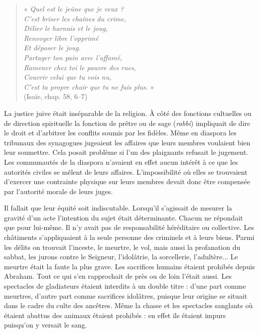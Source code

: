 \begin{verse}
 « \emph{Quel est le jeûne que je veux ? \\
 C'est briser les chaînes du crime, \\
 Délier le harnais et le joug, \\
 Renvoyer libre l'opprimé \\
 Et déposer le joug. \\
 Partager ton pain avec l'affamé, \\
 Ramener chez toi le pauvre des rues, \\
 Couvrir celui que tu vois nu, \\
 C'est ta propre chair que tu ne fuis plus.} » \\
 (Isaïe, chap. 58, 6--7)
\end{verse}



 La justice juive était inséparable de la religion. À côté des fonctions cultuelles ou de direction spirituelle la fonction de prêtre ou de sage (\emph{rabbi}) impliquait de dire le droit et d'arbitrer les conflits soumis par les fidèles. Même en diaspora les tribunaux des synagogues jugeaient les affaires que leurs membres voulaient bien leur soumettre. Cela posait problème si l'un des plaignants refusait le jugement. Les communautés de la diaspora n'avaient en effet aucun intérêt à ce que les autorités civiles se mêlent de leurs affaires. L'impossibilité où elles se trouvaient d'exercer une contrainte physique sur leurs membres devait donc être compensée par l'autorité morale de leurs juges. 
 
 Il fallait que leur équité soit indiscutable. Lorsqu'il s'agissait de mesurer la gravité d'un acte l'intention du sujet était déterminante. Chacun ne répondait que pour lui-même. Il n'y avait pas de responsabilité héréditaire ou collective. Les châtiments s'appliquaient à la seule personne des criminels et à leurs biens. Parmi les délits on trouvait l'inceste, le meurtre, le vol, mais aussi la profanation du sabbat, les jurons contre le Seigneur, l'idolâtrie, la sorcellerie, l'adultère... Le meurtre était la faute la plus grave. Les sacrifices humains étaient prohibés depuis Abraham. Tout ce qui s'en rapprochait de près ou de loin l'était aussi. Les spectacles de gladiateurs étaient interdits à un double titre : d'une part comme meurtres, d'autre part comme sacrifices idolâtres, puisque leur origine se situait dans le cadre du culte des ancêtres. Même la chasse et les spectacles sanglants où étaient abattus des animaux étaient prohibés : en effet ils étaient impurs puisqu'on y versait le sang. 


